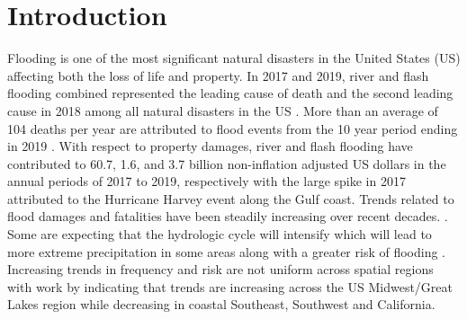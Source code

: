 \section{Introduction}
%
Flooding is one of the most significant natural disasters in the United States (US) affecting both the loss of life and property. 
In 2017 and 2019, river and flash flooding combined represented the leading cause of death and the second leading cause in 2018 among all natural disasters in the US \cite{national_weather_service_2020,national_weather_service_2019,national_weather_service_2018}. 
More than an average of 104 deaths per year are attributed to flood events from the 10 year period ending in 2019 \cite{us_department_of_commerce_2020}. 
With respect to property damages, river and flash flooding have contributed to 60.7, 1.6, and 3.7 billion non-inflation adjusted US dollars in the annual periods of 2017 to 2019, respectively \cite{national_weather_service_2020,national_weather_service_2019,national_weather_service_2018} with the large spike in 2017 attributed to the Hurricane Harvey event along the Gulf coast. 
Trends related to flood damages and fatalities have been steadily increasing over recent decades. \cite{mallakpour2015changing,downton2005reanalysis,kunkel1999temporal,pielke2000precipitation,corringham2019effect}. 
Some are expecting that the hydrologic cycle will intensify which will lead to more extreme precipitation in some areas along with a greater risk of flooding \cite{tabari2020climate,milly2002increasing,wing2018estimates}. 
Increasing trends in frequency and risk are not uniform across spatial regions with work by  indicating that trends are increasing across the US Midwest/Great Lakes region while decreasing in coastal Southeast, Southwest and California.
%
